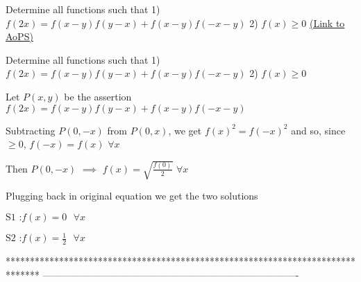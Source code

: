 \begin{problem}
	Determine all functions  such that 
1) $ f(2x) =f(x-y)f(y-x) + f(x-y)f(-x-y) $
2) $ f(x) \ge 0 $
	\flushright \href{https://artofproblemsolving.com/community/c6h606184}{(Link to AoPS)}
\end{problem}



\begin{solution}
	\begin{tcolorbox}Determine all functions  such that 
1) $ f(2x) =f(x-y)f(y-x) + f(x-y)f(-x-y) $
2) $ f(x) \ge 0 $\end{tcolorbox}
Let $P(x,y)$ be the assertion $f(2x)=f(x-y)f(y-x)+f(x-y)f(-x-y)$

Subtracting $P(0,-x)$ from $P(0,x)$, we get  $f(x)^2=f(-x)^2$ and so, since $\ge 0$, $f(-x)=f(x)$ $\forall x$

Then $P(0,-x)$ $\implies$ $f(x)=\sqrt{\frac{f(0)}2}$ $\forall x$

Plugging back in original equation we get the two solutions

$\boxed{\text{S1 :}f(x)=0\text{  }\forall x}$

$\boxed{\text{S2 :}f(x)=\frac 12\text{  }\forall x}$
\end{solution}
*******************************************************************************
-------------------------------------------------------------------------------




